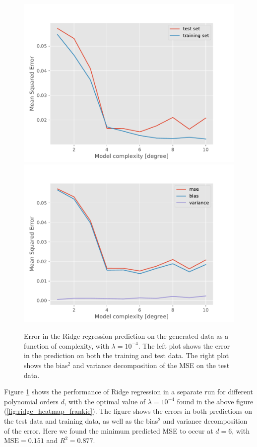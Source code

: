 \begin{figure}[!h]
    \centering
    \includegraphics[scale=0.48]{Figures/RIDGE/deg_analysis_ridge_test_train_004.pdf}
    \includegraphics[scale=0.48]{Figures/RIDGE/deg_analysis_ridge_bias_variance_005.pdf}
    \caption{Error in the Ridge regression prediction on the generated data as a function of complexity, with $\lambda = 10^{-4}$. The left plot shows the error in the prediction on both the training and test data. The right plot shows the bias$^2$ and variance decomposition of the MSE on the test data.}
    \label{fig:ridge_frankie_train_test_bias_variance}
\end{figure}
Figure \ref{fig:ridge_frankie_train_test_bias_variance} shows the performance of Ridge regression in a separate run for different polynomial orders $d$, with the optimal value of $\lambda = 10^{-4}$ found in the above figure (\ref{fig:ridge_heatmap_frankie}). The figure shows the errors in both predictions on the test data and training data, as well as the bias$^2$ and variance decomposition of the error. Here we found the minimum predicted MSE to occur at $d = 6$, with $\text{MSE} = 0.151$ and $R^2 = 0.877$.


